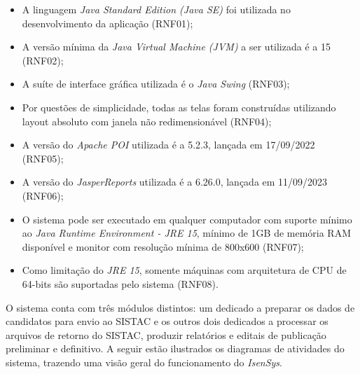 \documentclass[
	12pt,			%
	openright,		%
	oneside,	
	a4paper,		%
	english,		%
	brazil			%
]{abntex2/abntex2}  %
\begin{document}
		\begin{itemize}
			
			\item A linguagem \textit{Java Standard Edition (Java SE)} foi utilizada no desenvolvimento da aplicação (RNF01);
			\item A versão mínima da \textit{Java Virtual Machine (JVM)} a ser utilizada é a 15 (RNF02);
			\item A suíte de interface gráfica utilizada é o \textit{Java Swing} (RNF03);
			\item Por questões de simplicidade, todas as telas foram construídas utilizando layout absoluto com janela não redimensionável (RNF04);
			\item A versão do \textit{Apache POI} utilizada é a 5.2.3, lançada em 17/09/2022 (RNF05);
			\item A versão do \textit{JasperReports\textregistered} utilizada é a 6.26.0, lançada em 11/09/2023 (RNF06);
			\item O sistema pode ser executado em qualquer computador com suporte mínimo ao \textit{Java Runtime Environment - JRE 15}, mínimo de 1GB de memória RAM disponível e monitor com resolução mínima de 800x600 (RNF07);
			\item Como limitação do \textit{JRE 15}, somente máquinas com arquitetura de CPU de 64-bits são suportadas pelo sistema (RNF08).
			
		\end{itemize}
	
		O sistema conta com três módulos distintos: um dedicado a preparar os dados de candidatos para envio ao SISTAC e os outros dois dedicados a processar os arquivos de retorno do SISTAC, produzir relatórios e editais de publicação preliminar e definitivo. A seguir estão ilustrados os diagramas de atividades do sistema, trazendo uma visão geral do funcionamento do \textit{IsenSys}.
		
\end{document}
